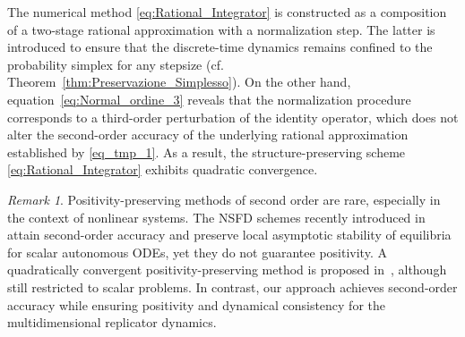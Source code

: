 \documentclass[11pt,letterpaper]{article}
\theoremstyle{remark}
\newtheorem{remark}{Remark}[section]
\begin{document}
The numerical method \eqref{eq:Rational_Integrator} is constructed as a composition of a two-stage rational approximation with a normalization step. The latter is introduced to ensure that the discrete-time dynamics remains confined to the probability simplex for any stepsize (cf. Theorem~\ref{thm:Preservazione_Simplesso}). On the other hand, equation~\eqref{eq:Normal_ordine_3} reveals that the normalization procedure corresponds to a third-order perturbation of the identity operator, which does not alter the second-order accuracy of the underlying rational approximation established by \eqref{eq_tmp_1}. As a result, the structure-preserving scheme \eqref{eq:Rational_Integrator} exhibits quadratic convergence.

\begin{remark}
    Positivity-preserving methods of second order are rare, especially in the context of nonlinear systems. The NSFD schemes recently introduced in~\cite{Gupta,Kojouharov} attain second-order accuracy and preserve local asymptotic stability of equilibria for scalar autonomous ODEs, yet they do not guarantee positivity. A quadratically convergent positivity-preserving method is proposed in~\cite{Hoang_Second}, although still restricted to scalar problems. In contrast, our approach achieves second-order accuracy while ensuring positivity and dynamical consistency for the multidimensional replicator dynamics.
\end{remark}
\end{document}
